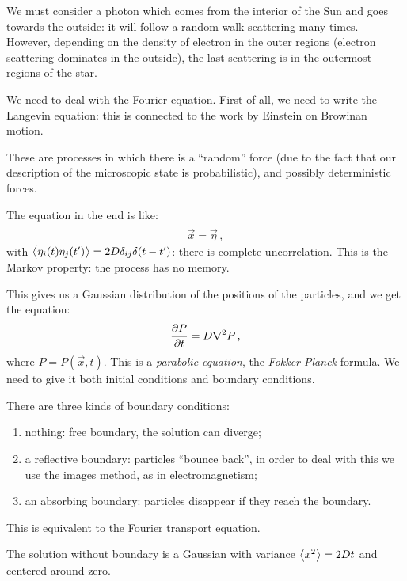 \documentclass[main.tex]{subfiles}
\begin{document}
We must consider a photon which comes from the interior of the Sun and goes towards the outside: it will follow a random walk scattering many times. However, depending on the density of electron in the outer regions (electron scattering dominates in the outside), the last scattering is in the outermost regions of the star. 

We need to deal with the Fourier equation. 
First of all, we need to write the Langevin equation: this is connected to the work by Einstein on Browinan motion. 

These are processes in which there is a ``random'' force (due to the fact that our description of the microscopic state is probabilistic), and possibly deterministic forces. 


The equation in the end is like: 
%
\begin{align}
  \dot{\vec{x}} = \vec{\eta}
\,,
\end{align}
%
with \(\expval{\eta _i (t) \eta_j (t')} = 2 D \delta_{ij} \delta (t - t')\): there is complete uncorrelation. This is the Markov property: the process has no memory.

This gives us a Gaussian distribution of the positions of the particles, and we get the equation: 
%
\begin{align}
  \pdv{P}{t} = D \nabla^2 P 
\,,
\end{align}
%
where \(P = P( \vec{x}, t)\). This is a \emph{parabolic equation}, the \emph{Fokker-Planck} formula. 
We need to give it both initial conditions and boundary conditions. 


There are three kinds of boundary conditions: 
\begin{enumerate}
  \item nothing: free boundary, the solution can diverge;
  \item a reflective boundary: particles ``bounce back'', in order to deal with this we use the images method, as in electromagnetism;
  \item an absorbing boundary: particles disappear if they reach the boundary. 
\end{enumerate}

This is equivalent to the Fourier transport equation. 

The solution without boundary is a Gaussian with variance \(\expval{x^2} =  2 D t\) and centered around zero. 
\end{document}
